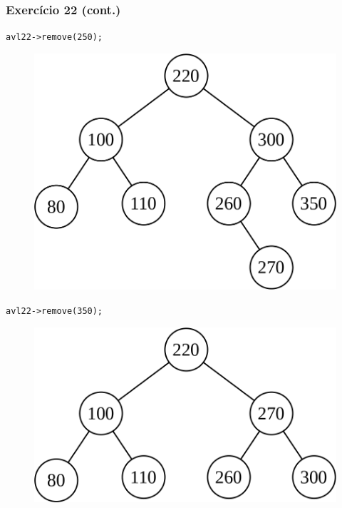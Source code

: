 \documentclass[aspectratio=169]{beamer}
\begin{document}
\begin{frame}[fragile]\frametitle{Exercício 22 (cont.)}
\texttt{avl22->remove(250);}
\begin{figure}[h]
	\centering
	\includegraphics[height=0.25\paperheight]{imagens/avl-exercicio22h.png}
\end{figure}
\texttt{avl22->remove(350);}
\begin{figure}[h]
	\centering
	\includegraphics[height=0.18\paperheight]{imagens/avl-exercicio22i.png}
\end{figure}
\end{frame}

\end{document}
